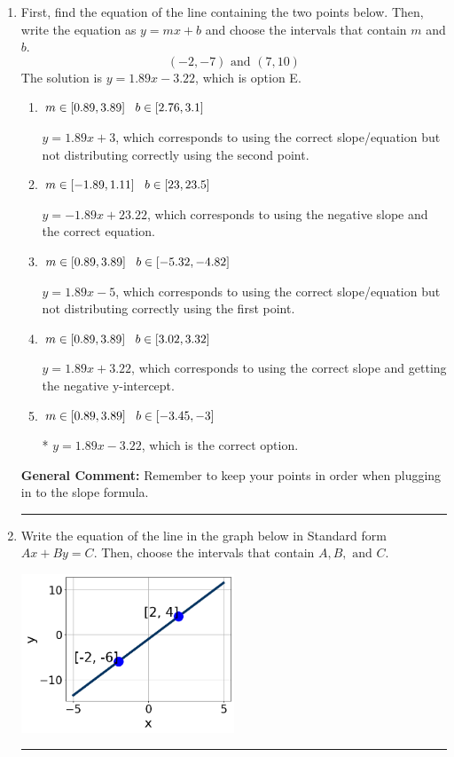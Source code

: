 \documentclass{extbook}[14pt]
\newcommand{\litem}[1]{\item #1

\rule{\textwidth}{0.4pt}}
\begin{document}
\begin{enumerate}\litem{
First, find the equation of the line containing the two points below. Then, write the equation as $ y=mx+b $ and choose the intervals that contain $m$ and $b$.
\[ (-2, -7) \text{ and } (7, 10) \]
The solution is \( y = 1.89x -3.22 \), which is option E.\begin{enumerate}[label=\Alph*.]
\item \( m \in [0.89, 3.89] \hspace*{3mm} b \in [2.76, 3.1] \)

 $y = 1.89x + 3$, which corresponds to using the correct slope/equation but not distributing correctly using the second point.
\item \( m \in [-1.89, 1.11] \hspace*{3mm} b \in [23, 23.5] \)

 $y = -1.89x + 23.22$, which corresponds to using the negative slope and the correct equation.
\item \( m \in [0.89, 3.89] \hspace*{3mm} b \in [-5.32, -4.82] \)

 $y = 1.89x -5$, which corresponds to using the correct slope/equation but not distributing correctly using the first point.
\item \( m \in [0.89, 3.89] \hspace*{3mm} b \in [3.02, 3.32] \)

 $y = 1.89x + 3.22$, which corresponds to using the correct slope and getting the negative y-intercept.
\item \( m \in [0.89, 3.89] \hspace*{3mm} b \in [-3.45, -3] \)

* $y = 1.89x -3.22$, which is the correct option.
\end{enumerate}

\textbf{General Comment:} Remember to keep your points in order when plugging in to the slope formula.
}
\litem{
Write the equation of the line in the graph below in Standard form $Ax+By=C$. Then, choose the intervals that contain $A, B, \text{ and } C$.

\begin{center}
    \includegraphics[width=0.5\textwidth]{../Figures/linearGraphToStandardCopyC.png}
\end{center}



}
\end{enumerate}
\end{document}
